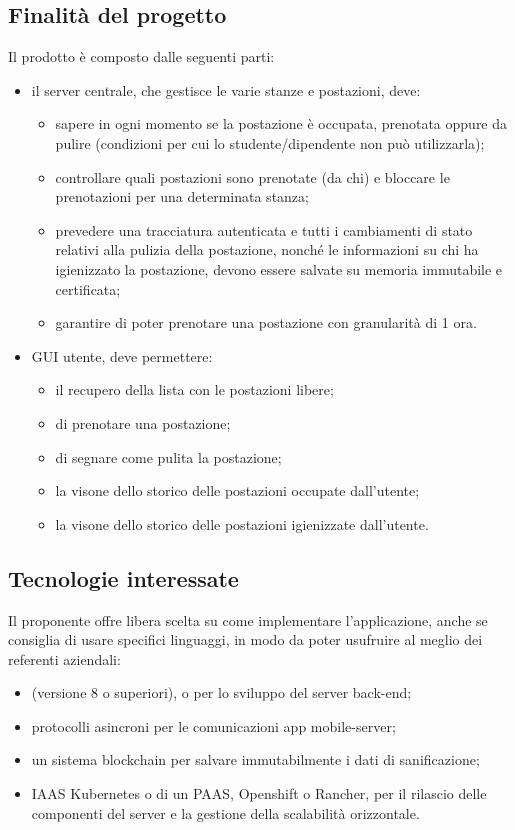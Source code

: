 \subsection{Finalità del progetto}
Il prodotto è composto dalle seguenti parti:
\begin{itemize}
\item il server centrale, che gestisce le varie stanze e postazioni, deve:
\begin{itemize}
\item sapere in ogni momento se la postazione è occupata, prenotata oppure da pulire (condizioni per cui
lo studente/dipendente non può utilizzarla);
\item controllare quali postazioni sono prenotate (da chi) e bloccare le prenotazioni per una determinata stanza;
\item prevedere una tracciatura autenticata e tutti i cambiamenti di stato relativi alla pulizia della
postazione, nonché le informazioni su chi ha igienizzato la postazione, devono essere salvate su
memoria immutabile e certificata;
\item garantire di poter prenotare una postazione con granularità di 1 ora.
\end{itemize}
\item GUI utente, deve permettere:
\begin{itemize}
\item il recupero della lista con le postazioni libere;
\item di prenotare una postazione;
\item di segnare come pulita la postazione;
\item la visone dello storico delle postazioni occupate dall'utente;
\item la visone dello storico delle postazioni igienizzate dall'utente.
\end{itemize}
\end{itemize}

\subsection{Tecnologie interessate}
Il proponente offre libera scelta su come implementare l'applicazione, anche se consiglia di usare specifici linguaggi, in modo da poter usufruire al meglio dei referenti aziendali:
\begin{itemize}
\item {} (versione 8 o superiori),  o  per lo sviluppo del server back-end;
\item protocolli asincroni per le comunicazioni app mobile-server;
\item un sistema blockchain per salvare immutabilmente i dati di sanificazione;
\item IAAS Kubernetes o di un PAAS, Openshift o Rancher, per il rilascio delle componenti del server e la
gestione della scalabilità orizzontale.
\end{itemize}

